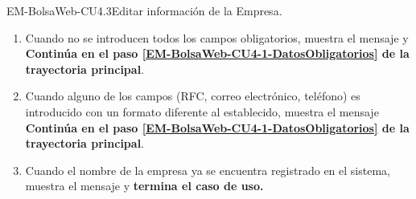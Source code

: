 \begin{UseCase}{EM-BolsaWeb-CU4.3}{Editar información de la Empresa.}
{\begin{enumerate}
			\item \label{EM-BolsaWeb-CU4-3-E1} Cuando no se introducen todos los campos obligatorios, muestra el mensaje  y \textbf{Continúa en el paso \ref{EM-BolsaWeb-CU4-1-DatosObligatorios} de la trayectoria principal}.

			\item \label{EM-BolsaWeb-CU4-3-E2} Cuando alguno de los campos (RFC, correo electrónico, teléfono) es introducido con un formato diferente al establecido, muestra el mensaje  \textbf{Continúa en el paso \ref{EM-BolsaWeb-CU4-1-DatosObligatorios} de la trayectoria principal}.

			\item \label{EM-BolsaWeb-CU4-3-E3} Cuando el nombre de la empresa ya se encuentra registrado en el sistema, muestra el mensaje  y \textbf{termina el caso de uso.}

		\end{enumerate}	
	}
\end{UseCase}

